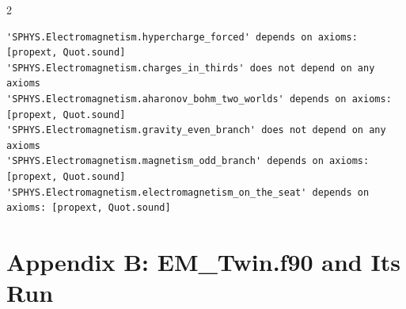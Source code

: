 \documentclass[10pt]{article}
\begin{document}
\begin{multicols}{2}
\begin{Verbatim}[fontsize=\fontsize{6.0}{6.9}\selectfont,breaklines,breakanywhere,breaksymbolleft={}]
'SPHYS.Electromagnetism.hypercharge_forced' depends on axioms: [propext, Quot.sound]
'SPHYS.Electromagnetism.charges_in_thirds' does not depend on any axioms
'SPHYS.Electromagnetism.aharonov_bohm_two_worlds' depends on axioms: [propext, Quot.sound]
'SPHYS.Electromagnetism.gravity_even_branch' does not depend on any axioms
'SPHYS.Electromagnetism.magnetism_odd_branch' depends on axioms: [propext, Quot.sound]
'SPHYS.Electromagnetism.electromagnetism_on_the_seat' depends on axioms: [propext, Quot.sound]
\end{Verbatim}
\end{multicols}

\hypertarget{appendix-b-em_twin.f90-and-its-run}{%
\section{Appendix B: EM\_Twin.f90 and Its
Run}\label{appendix-b-em_twin.f90-and-its-run}}
\end{document}
